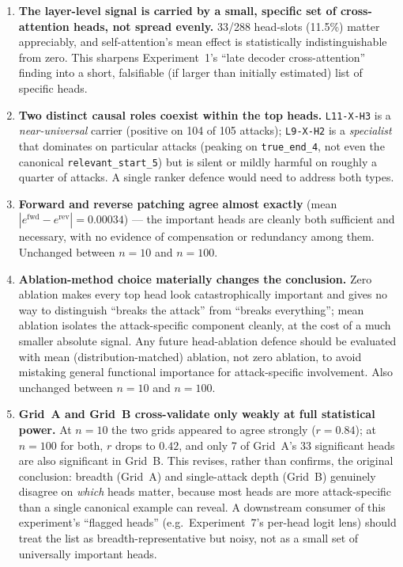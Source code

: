 \documentclass[11pt]{article}
\newcommand{\fwd}{\ensuremath{e^{\mathrm{fwd}}}}
\newcommand{\rev}{\ensuremath{e^{\mathrm{rev}}}}
\begin{document}
\begin{enumerate}
  \item \textbf{The layer-level signal is carried by a small, specific set
  of cross-attention heads, not spread evenly.} 33/288 head-slots (11.5\%)
  matter appreciably, and self-attention's mean effect is statistically
  indistinguishable from zero. This sharpens Experiment~1's ``late decoder
  cross-attention'' finding into a short, falsifiable (if larger than
  initially estimated) list of specific heads.
  \item \textbf{Two distinct causal roles coexist within the top heads.}
  \texttt{L11-X-H3} is a \emph{near-universal} carrier (positive on 104 of
  105 attacks); \texttt{L9-X-H2} is a \emph{specialist} that dominates on
  particular attacks (peaking on \texttt{true\_end\_4}, not even the
  canonical \texttt{relevant\_start\_5}) but is silent or mildly harmful on
  roughly a quarter of attacks. A single ranker defence would need to
  address both types.
  \item \textbf{Forward and reverse patching agree almost exactly}
  (mean $|\fwd-\rev|=0.00034$) — the important heads are cleanly both
  sufficient and necessary, with no evidence of compensation or
  redundancy among them. Unchanged between $n=10$ and $n=100$.
  \item \textbf{Ablation-method choice materially changes the conclusion.}
  Zero ablation makes every top head look catastrophically important and
  gives no way to distinguish ``breaks the attack'' from ``breaks
  everything''; mean ablation isolates the attack-specific component
  cleanly, at the cost of a much smaller absolute signal. Any future
  head-ablation defence should be evaluated with mean (distribution-matched)
  ablation, not zero ablation, to avoid mistaking general functional
  importance for attack-specific involvement. Also unchanged between $n=10$
  and $n=100$.
  \item \textbf{Grid~A and Grid~B cross-validate only weakly at full
  statistical power.} At $n=10$ the two grids appeared to agree strongly
  ($r=0.84$); at $n=100$ for both, $r$ drops to $0.42$, and only 7 of
  Grid~A's 33 significant heads are also significant in Grid~B. This
  revises, rather than confirms, the original conclusion: breadth
  (Grid~A) and single-attack depth (Grid~B) genuinely disagree on
  \emph{which} heads matter, because most heads are more attack-specific
  than a single canonical example can reveal. A downstream consumer of
  this experiment's ``flagged heads'' (e.g.\ Experiment~7's per-head logit
  lens) should treat the list as breadth-representative but noisy, not as
  a small set of universally important heads.
\end{enumerate}
\end{document}

